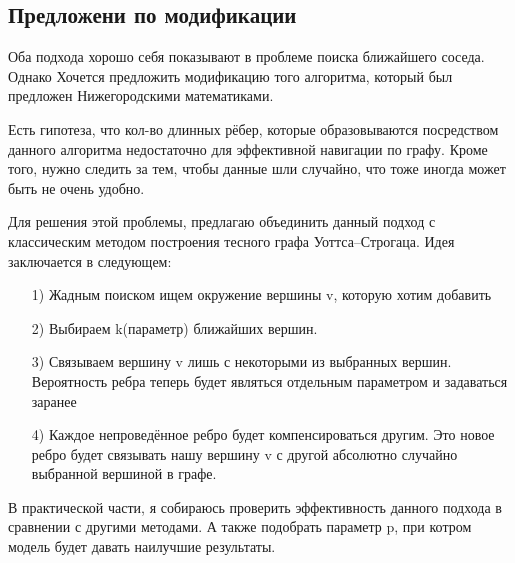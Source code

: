 \subsection{Предложени по модификации}

Оба подхода хорошо себя показывают в проблеме поиска ближайшего соседа. Однако Хочется
предложить модификацию того алгоритма, который был предложен Нижегородскими математиками.

Есть гипотеза, что кол-во длинных рёбер, которые образовываются посредством данного алгоритма
недостаточно для эффективной навигации по графу. Кроме того, нужно следить за тем, чтобы данные
шли случайно, что тоже иногда может быть не очень удобно.

Для решения этой проблемы, предлагаю объединить данный подход с классическим методом построения
тесного графа Уоттса–Строгаца. Идея заключается в следующем:

\begin{itemize}
    \item [1)] Жадным поиском ищем окружение вершины v, которую хотим добавить
    \item [2)] Выбираем k(параметр) ближайших вершин.
    \item [3)] Связываем вершину v лишь с некоторыми из выбранных вершин. Вероятность ребра 
    теперь будет являться отдельным параметром и задаваться заранее
    \item [4)] Каждое непроведённое ребро будет компенсироваться другим. Это новое ребро будет связывать
    нашу вершину v с другой абсолютно случайно выбранной вершиной в графе.
\end{itemize}

В практической части, я собираюсь проверить эффективность данного подхода в сравнении с другими методами.
А также подобрать параметр p, при котром модель будет давать наилучшие результаты.